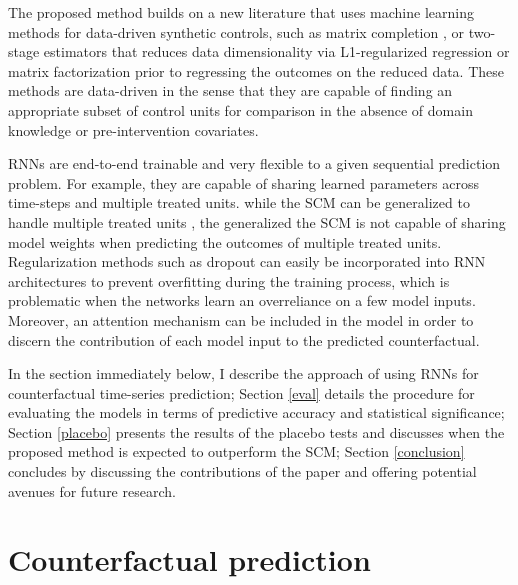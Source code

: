 \documentclass[hidelinks,12pt]{article}
\begin{document}
The proposed method builds on a new literature that uses machine learning methods for data-driven synthetic controls, such as matrix completion \citep{athey2017matrix,2019arXiv190308028P}, or two-stage estimators that reduces data dimensionality via L1-regularized regression \citep{doudchenko2016balancing,carvalho2018arco} or matrix factorization \citep{amjad2018robust} prior to regressing the outcomes on the reduced data. These methods are data-driven in the sense that they are capable of finding an appropriate subset of control units for comparison in the absence of domain knowledge or pre-intervention covariates. 

RNNs are end-to-end trainable and very flexible to a given sequential prediction problem. For example, they are capable of sharing learned parameters across time-steps and multiple treated units. while the SCM can be generalized to handle multiple treated units \citep[e.g.,][]{dube2015pooling,xu2017generalized}, the generalized the SCM is not capable of sharing model weights when predicting the outcomes of multiple treated units. Regularization methods such as dropout can easily be incorporated into RNN architectures to prevent overfitting during the training process, which is problematic when the networks learn an overreliance on a few model inputs. Moreover, an attention mechanism can be included in the model in order to discern the contribution of each model input to the predicted counterfactual. 

In the section immediately below, I describe the approach of using RNNs for counterfactual time-series prediction; Section \ref{eval} details the procedure for evaluating the models in terms of predictive accuracy and statistical significance; Section \ref{placebo} presents the results of the placebo tests and discusses when the proposed method is expected to outperform the SCM; Section \ref{conclusion} concludes by discussing the contributions of the paper and offering potential avenues for future research. 

\section{Counterfactual prediction} \label{prediction}
\end{document}
